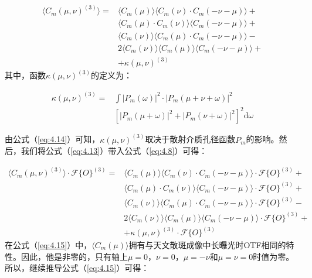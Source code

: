 \begin{equation}
\begin{aligned}
    \langle C_m(\mu,\nu)^{(3)} \rangle = &\langle C_m(\mu) \rangle \langle C_m(\nu) \cdot C_m(-\nu-\mu) \rangle + \\
		& \langle C_m(\mu)\cdot C_m(\nu) \rangle \langle C_m(-\nu-\mu) \rangle +\\
		& \langle C_m(\nu) \rangle \langle C_m(\mu) \cdot C_m(-\nu-\mu) \rangle -\\
		& 2\langle C_m(\nu) \rangle \langle C_m(\mu)\rangle \langle C_m(-\nu-\mu) \rangle +\\
		& + \kappa(\mu,\nu)^{(3)}
\end{aligned}
\label{eq:4.13}
\end{equation}其中，函数$\kappa(\mu,\nu)^{(3)}$的定义为：

\begin{equation}
\begin{aligned}
    \kappa(\mu,\nu)^{(3)} = &\int |P_m(\omega)|^2 \cdot |P_m(\mu+\nu+\omega)|^2 \\
		& \left[|P_m(\mu + \omega)|^2 + |P_m(\nu+\omega)|^2 \right]^2 \mathrm{d}{\omega}
\end{aligned}
\label{eq:4.14}
\end{equation}

由公式（\ref{eq:4.14}）可知，$\kappa(\mu,\nu)^{(3)}$取决于散射介质孔径函数$P_m$的影响。然后，我们将公式（\ref{eq:4.13}）带入公式（\ref{eq:4.8}）可得：

\begin{equation}
\begin{aligned}
    \langle C_m(\mu,\nu)^{(3)} \rangle \cdot \mathcal{F}\{ O \}^{(3)}= &\langle C_m(\mu) \rangle \langle C_m(\nu) \cdot C_m(-\nu-\mu) \rangle \cdot \mathcal{F}\{ O \}^{(3)}+ \\
		& \langle C_m(\mu)\cdot C_m(\nu) \rangle \langle C_m(-\nu-\mu) \rangle \cdot \mathcal{F}\{ O \}^{(3)}+\\
		& \langle C_m(\nu) \rangle \langle C_m(\mu) \cdot C_m(-\nu-\mu) \rangle \cdot \mathcal{F}\{ O \}^{(3)}-\\
		& 2\langle C_m(\nu) \rangle \langle C_m(\mu)\rangle \langle C_m(-\nu-\mu) \rangle \cdot \mathcal{F}\{ O \}^{(3)}+\\
		& + \kappa(\mu,\nu)^{(3)}\cdot \mathcal{F}\{ O \}^{(3)}
\end{aligned}
\label{eq:4.15}
\end{equation}
在公式（\ref{eq:4.15}）中，$\langle C_m(\mu) \rangle$拥有与天文散斑成像中长曝光时OTF相同的特性。因此，他是非零的，只有轴上$\mu = 0$，$\nu = 0$，$\mu = -\nu$和$\mu =\nu= 0$时值为零。所以，继续推导公式（\ref{eq:4.15}）可得：

